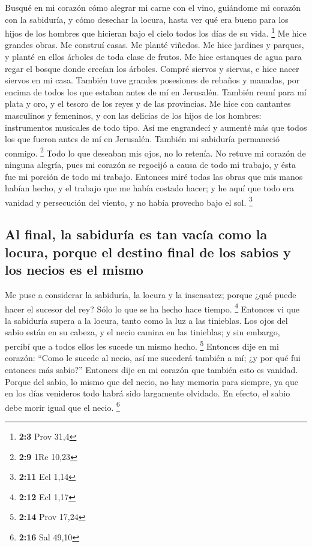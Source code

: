  Busqué en mi corazón cómo alegrar mi carne con el vino,
guiándome mi corazón con la sabiduría, y cómo desechar la locura, hasta
ver qué era bueno para los hijos de los hombres que hicieran bajo el
cielo todos los días de su vida. \footnote{\textbf{2:3} Prov 31,4}
 Me hice grandes obras. Me construí casas. Me planté
viñedos.  Me hice jardines y parques, y planté en ellos
árboles de toda clase de frutos.  Me hice estanques de
agua para regar el bosque donde crecían los árboles. 
Compré siervos y siervas, e hice nacer siervos en mi casa. También tuve
grandes posesiones de rebaños y manadas, por encima de todos los que
estaban antes de mí en Jerusalén.  También reuní para mí
plata y oro, y el tesoro de los reyes y de las provincias. Me hice con
cantantes masculinos y femeninos, y con las delicias de los hijos de los
hombres: instrumentos musicales de todo tipo.  Así me
engrandecí y aumenté más que todos los que fueron antes de mí en
Jerusalén. También mi sabiduría permaneció conmigo. \footnote{\textbf{2:9}
  1Re 10,23}  Todo lo que deseaban mis ojos, no lo
retenía. No retuve mi corazón de ninguna alegría, pues mi corazón se
regocijó a causa de todo mi trabajo, y ésta fue mi porción de todo mi
trabajo.  Entonces miré todas las obras que mis manos
habían hecho, y el trabajo que me había costado hacer; y he aquí que
todo era vanidad y persecución del viento, y no había provecho bajo el
sol. \footnote{\textbf{2:11} Ecl 1,14}

\hypertarget{al-final-la-sabiduruxeda-es-tan-vacuxeda-como-la-locura-porque-el-destino-final-de-los-sabios-y-los-necios-es-el-mismo}{%
\subsection{Al final, la sabiduría es tan vacía como la locura, porque
el destino final de los sabios y los necios es el
mismo}\label{al-final-la-sabiduruxeda-es-tan-vacuxeda-como-la-locura-porque-el-destino-final-de-los-sabios-y-los-necios-es-el-mismo}}

 Me puse a considerar la sabiduría, la locura y la
insensatez; porque ¿qué puede hacer el sucesor del rey? Sólo lo que se
ha hecho hace tiempo. \footnote{\textbf{2:12} Ecl 1,17} 
Entonces vi que la sabiduría supera a la locura, tanto como la luz a las
tinieblas.  Los ojos del sabio están en su cabeza, y el
necio camina en las tinieblas; y sin embargo, percibí que a todos ellos
les sucede un mismo hecho. \footnote{\textbf{2:14} Prov 17,24}
 Entonces dije en mi corazón: ``Como le sucede al necio,
así me sucederá también a mí; ¿y por qué fui entonces más sabio?''
Entonces dije en mi corazón que también esto es vanidad. 
Porque del sabio, lo mismo que del necio, no hay memoria para siempre,
ya que en los días venideros todo habrá sido largamente olvidado. En
efecto, el sabio debe morir igual que el necio. \footnote{\textbf{2:16}
  Sal 49,10}

